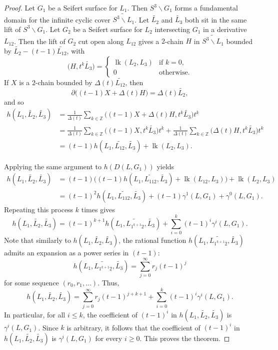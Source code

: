 \documentclass[a4paper, 11pt]{amsart}
\theoremstyle{definition}
\newcommand{\bdry}{\partial}
\newcommand{\lk}{\operatorname{lk}}
\newcommand{\noteta}{h}
\begin{document}
\begin{proof}
Let $G_1$ be a Seifert surface for $L_1$.
Then $S^3\smallsetminus G_1$ forms a fundamental domain for the infinite cyclic cover $\widetilde{S^3\smallsetminus L_1}$. Let $\widetilde{L_2}$ and $\widetilde{L_3}$ both sit in the same lift of $S^3\smallsetminus G_1$.
Let $G_2$ be a Seifert surface for $L_2$ 
intersecting $G_1$ in a derivative $L_{12}$. Then the lift of $G_2$ cut open along $L_{12}$ gives a $2$-chain $H$ in $\widetilde{S^3\smallsetminus L_1}$ bounded by $\widetilde{L_2}-(t-1)\widetilde{L_{12}}$, with
\[
\bigl(H, t^k \widetilde{L_3}\bigr)=
\begin{cases}
\lk(L_2,L_3) & \text{if } k=0,\\
0 & \text{otherwise.}
\end{cases}
\]
If $X$ is a $2$-chain bounded by $\Delta(t)\widetilde{L_{12}}$, then
\[
\bdry\bigl((t-1)X+\Delta(t)H\bigr)=\Delta(t)\widetilde{L_2},
\]
and so
\begin{align*}
\noteta(L_1,\widetilde{L_2},\widetilde{L_3})
&=
\frac{1}{\Delta(t)}\sum_{k\in \mathbb{Z}} \bigl((t-1)X+\Delta(t)H, t^k\widetilde{L_3}\bigr)t^k \\
&=
\frac{1}{\Delta(t)}\sum_{k\in \mathbb{Z}} \bigl((t-1)X, t^k\widetilde{L_3}\bigr)t^k
+
\frac{1}{\Delta(t)}\sum_{k\in \mathbb{Z}} \bigl(\Delta(t)H, t^k\widetilde{L_3}\bigr)t^k \\
&=
(t-1)\noteta(L_1,\widetilde{L_{12}},\widetilde{L_3})+\lk(L_2, L_3).
\end{align*}

Applying the same argument to $\noteta(D(L,G_1))$ yields
\begin{align*}
\noteta(L_1,\widetilde{L_2},\widetilde{L_3})
&=(t-1)\bigl((t-1)\noteta(L_1,\widetilde{L_{112}},\widetilde{L_3})+\lk(L_{12},L_3)\bigr)+\lk(L_2,L_3) \\
&=(t-1)^2\noteta(L_1,\widetilde{L_{112}},\widetilde{L_3})+(t-1)\gamma^1(L,G_1)+\gamma^0(L,G_1).
\end{align*}
Repeating this process $k$ times gives
\[
\noteta(L_1,\widetilde{L_2},\widetilde{L_3})=(t-1)^{k+1}\noteta(L_1,\widetilde{L_{1^{k+1}2}},\widetilde{L_3})+\sum_{i=0}^{k}(t-1)^i\gamma^i(L,G_1).
\]
Note that similarly to $\noteta(L_1,\widetilde{L_2},\widetilde{L_3})$, the rational function $\noteta(L_1,\widetilde{L_{1^{k+1}2}},\widetilde{L_3})$ admits an expansion as a power series in $(t-1)$:
\[
\noteta(L_1,\widetilde{L_{1^{k+1}2}},\widetilde{L_3})=\sum_{j=0}^\infty r_j (t-1)^j
\]
for some sequence $(r_0,r_1,\dots)$. Thus,
\[
\noteta(L_1,\widetilde{L_2},\widetilde{L_3})=\sum_{j=0}^\infty r_j (t-1)^{j+k+1}+\sum_{i=0}^{k}(t-1)^i\gamma^i(L,G_1).
\]
In particular, for all $i\le k$, the coefficient of $(t-1)^i$ in $\noteta(L_1,\widetilde{L_2},\widetilde{L_3})$ is $\gamma^i(L,G_1)$. Since $k$ is arbitrary, it follows that the coefficient of $(t-1)^i$ in $\noteta(L_1,\widetilde{L_2},\widetilde{L_3})$ is $\gamma^i(L,G_1)$ for every $i\ge 0$. This proves the theorem.
\end{proof}
\end{document}
